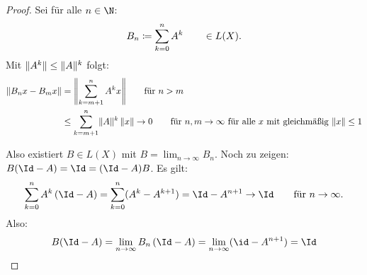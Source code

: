 \begin{proof}
    Sei für alle $n\in\N$:
    \[ B_n \defeq \ksum[0]^n A^k \qquad\in L(X)  . \]
    Mit $\norm{A^k}\leq \norm{A}^k$ folgt:
    \begin{align*}
        \norm{B_n x - B_m x} &= \norm*{ \ksum[m+1]^n A^k x }
        \fuer n > m
        \\
        &\leq \ksum[m+1]^n \norm{A}^k \, \norm{x}
        \to 0 \fuer n,m\to\infty \text{ für alle $x$ mit 
            gleichmäßig $\norm{x}\leq 1$}
    \end{align*}
    
    Also existiert $B\in L(X)$ mit $B=\lim_{n\to\infty} B_n$.
    Noch zu zeigen: $B(\Id-A) = \Id = (\Id-A)B$. Es gilt:
    \[ \ksum[0]^n A^k\, (\Id-A) 
    = \ksum[0]^n (A^k-A^{k+1}) = \Id - A^{n+1} 
    \to \Id \fuer n\to\infty
    . \]
    Also:
    \[ B(\Id-A) = \lim_{n\to\infty} B_n \, (\Id-A)
        = \lim_{n\to\infty} (\id-A^{n+1}) = \Id 
    \]
\end{proof}







